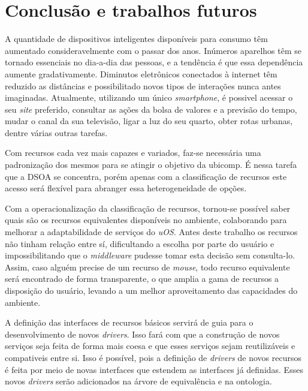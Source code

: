 \chapter{Conclusão e trabalhos futuros}

A quantidade de dispositivos inteligentes disponíveis para consumo têm aumentado consideravelmente com o passar dos anos. Inúmeros aparelhos têm se tornado essenciais no dia-a-dia das pessoas, e a tendência é que essa dependência aumente gradativamente. Diminutos eletrônicos conectados à internet têm reduzido as distâncias e possibilitado novos tipos de interações nunca antes imaginadas. Atualmente, utilizando um único \emph{smartphone}, é possivel acessar o seu \emph{site} preferido, consultar as ações da bolsa de valores e a previsão do tempo, mudar o canal da sua televisão, ligar a luz do seu quarto, obter rotas urbanas, dentre várias outras tarefas.
\begin{comment}
É nesse ambiente cada vez mais ubíquo que a classificação de recursos se insere: ambientes com dispositivos heterogêneos (móveis ou não) interagindo entre si, trocando informações ou utilizando capacidades características de cada aparelho.
\end{comment}

Com recursos cada vez mais capazes e variados, faz-se necessária uma padronização dos mesmos para se atingir o objetivo da ubicomp. É nessa tarefa que a DSOA se concentra, porém apenas com a classificação de recursos este acesso será flexível para abranger essa heterogeneidade de opções.

Com a operacionalização da classificação de recursos, tornou-se possível saber quais são os recursos equivalentes disponíveis no ambiente, colaborando para melhorar a adaptabilidade de serviços do \emph{uOS}. Antes deste trabalho os recursos não tinham relação entre sí, dificultando a escolha por parte do usuário e impossibilitando que o \emph{middleware} pudesse tomar esta decisão sem consulta-lo. Assim, caso alguém precise de um recurso de \emph{mouse}, todo recurso equivalente será encontrado de forma transparente, o que amplia a gama de recursos a disposição do usuário, levando a um melhor aproveitamento das capacidades do ambiente.

A definição das interfaces de recursos básicos servirá de guia para o desenvolvimento de novos \emph{drivers}. Isso fará com que a construção de novos serviços seja feita de forma mais coesa e que esses serviços sejam reutilizáveis e compativeis entre si. Isso é possível, pois a definição de \emph{drivers} de novos recursos é feita por meio de novas interfaces que estendem as interfaces já definidas. Esses novos \emph{drivers} serão adicionados na árvore de equivalência e na ontologia.

